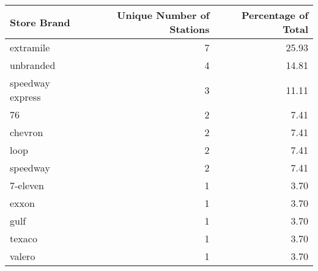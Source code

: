 \begin{tabular}{lrr}
\toprule
\textbf{Store Brand} & \textbf{Unique Number of Stations} & \textbf{Percentage of Total} \\
\midrule
extramile & 7 & 25.93 \\
unbranded & 4 & 14.81 \\
speedway express & 3 & 11.11 \\
76 & 2 & 7.41 \\
chevron & 2 & 7.41 \\
loop & 2 & 7.41 \\
speedway & 2 & 7.41 \\
7-eleven & 1 & 3.70 \\
exxon & 1 & 3.70 \\
gulf & 1 & 3.70 \\
texaco & 1 & 3.70 \\
valero & 1 & 3.70 \\
\bottomrule
\end{tabular}
